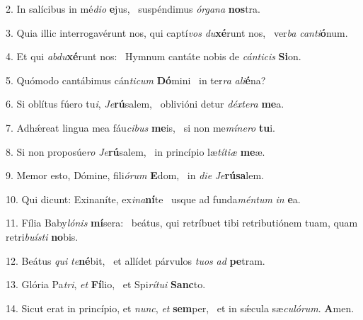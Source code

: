 2. In salícibus in mé\textit{di}\textit{o} \textbf{e}jus, \ast\  suspéndimus \textit{ór}\textit{ga}\textit{na} \textbf{nos}tra.\

3. Quia illic interrogavérunt nos, qui captí\textit{vos} \textit{du}\textbf{xé}runt nos, \ast\  ver\textit{ba} \textit{can}\textit{ti}\textbf{ó}num.\

4. Et qui \textit{ab}\textit{du}\textbf{xé}runt nos: \ast\  Hymnum cantáte nobis de \textit{cán}\textit{ti}\textit{cis} \textbf{Si}on.\

5. Quómodo cantábimus cán\textit{ti}\textit{cum} \textbf{Dó}mini \ast\  in ter\textit{ra} \textit{a}\textit{li}\textbf{é}na?\

6. Si oblítus fúero tu\textit{i}, \textit{Je}\textbf{rú}salem, \ast\  oblivióni detur \textit{déx}\textit{te}\textit{ra} \textbf{me}a.\

7. Adhǽreat lingua mea fáu\textit{ci}\textit{bus} \textbf{me}is, \ast\  si non me\textit{mí}\textit{ne}\textit{ro} \textbf{tu}i.\

8. Si non proposúe\textit{ro} \textit{Je}\textbf{rú}salem, \ast\  in princípio læ\textit{tí}\textit{ti}\textit{æ} \textbf{me}æ.\

9. Memor esto, Dómine, fili\textit{ó}\textit{rum} \textbf{E}dom, \ast\  in \textit{di}\textit{e} \textit{Je}\textbf{rú}\textbf{sa}lem.\

10. Qui dicunt: Exinaníte, ex\textit{i}\textit{na}\textbf{ní}te \ast\  usque ad funda\textit{mén}\textit{tum} \textit{in} \textbf{e}a.\

11. Fília Baby\textit{ló}\textit{nis} \textbf{mí}sera: \ast\  beátus, qui retríbuet tibi retributiónem tuam, quam retri\textit{bu}\textit{ís}\textit{ti} \textbf{no}bis.\

12. Beátus \textit{qui} \textit{te}\textbf{né}bit, \ast\  et allídet párvulos \textit{tu}\textit{os} \textit{ad} \textbf{pe}tram.\

13. Glória Pa\textit{tri}, \textit{et} \textbf{Fí}lio, \ast\  et Spi\textit{rí}\textit{tu}\textit{i} \textbf{Sanc}to.\

14. Sicut erat in princípio, et \textit{nunc}, \textit{et} \textbf{sem}per, \ast\  et in sǽcula sæ\textit{cu}\textit{ló}\textit{rum}. \textbf{A}men.\

